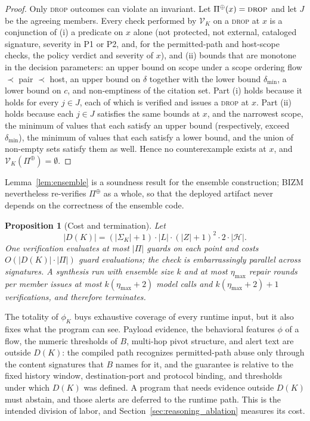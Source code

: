 \documentclass[final,5p]{elsarticle}
\newtheorem{proposition}{Proposition}
\begin{document}
\begin{proof}
Only \textsc{drop} outcomes can violate an invariant. Let $\Pi^{\oplus}(x)=\textsc{drop}$ and let $J$ be the agreeing members. Every check performed by $\mathcal{V}_K$ on a \textsc{drop} at $x$ is a conjunction of (i) a predicate on $x$ alone (not protected, not external, cataloged signature, severity in P1 or P2, and, for the permitted-path and host-scope checks, the policy verdict and severity of $x$), and (ii) bounds that are monotone in the decision parameters: an upper bound on scope under a scope ordering flow $\prec$ pair $\prec$ host, an upper bound on $\delta$ together with the lower bound $\delta_{\min}$, a lower bound on $c$, and non-emptiness of the citation set. Part (i) holds because it holds for every $j\in J$, each of which is verified and issues a \textsc{drop} at $x$. Part (ii) holds because each $j\in J$ satisfies the same bounds at $x$, and the narrowest scope, the minimum of values that each satisfy an upper bound (respectively, exceed $\delta_{\min}$), the minimum of values that each satisfy a lower bound, and the union of non-empty sets satisfy them as well. Hence no counterexample exists at $x$, and $\mathcal{V}_K(\Pi^{\oplus})=\emptyset$.
\end{proof}

Lemma~\ref{lem:ensemble} is a soundness result for the ensemble construction; BIZM nevertheless re-verifies $\Pi^{\oplus}$ as a whole, so that the deployed artifact never depends on the correctness of the ensemble code.

\begin{proposition}[Cost and termination]
\label{prop:cost}
Let
\[
|D(K)|=(|\Sigma_K|+1)\cdot|L|\cdot(|Z|+1)^2\cdot 2\cdot|\mathcal{H}|.
\]
One verification evaluates at most $|\Pi|$ guards on each point and costs $O(|D(K)|\cdot|\Pi|)$ guard evaluations; the check is embarrassingly parallel across signatures. A synthesis run with ensemble size $k$ and at most $\eta_{\max}$ repair rounds per member issues at most $k(\eta_{\max}+2)$ model calls and $k(\eta_{\max}+2)+1$ verifications, and therefore terminates.
\end{proposition}

The totality of $\phi_K$ buys exhaustive coverage of every runtime input, but it also fixes what the program can see. Payload evidence, the behavioral features $\phi$ of a flow, the numeric thresholds of $B$, multi-hop pivot structure, and alert text are outside $D(K)$: the compiled path recognizes permitted-path abuse only through the content signatures that $B$ names for it, and the guarantee is relative to the fixed history window, destination-port and protocol binding, and thresholds under which $D(K)$ was defined. A program that needs evidence outside $D(K)$ must abstain, and those alerts are deferred to the runtime path. This is the intended division of labor, and Section~\ref{sec:reasoning_ablation} measures its cost.
\end{document}
